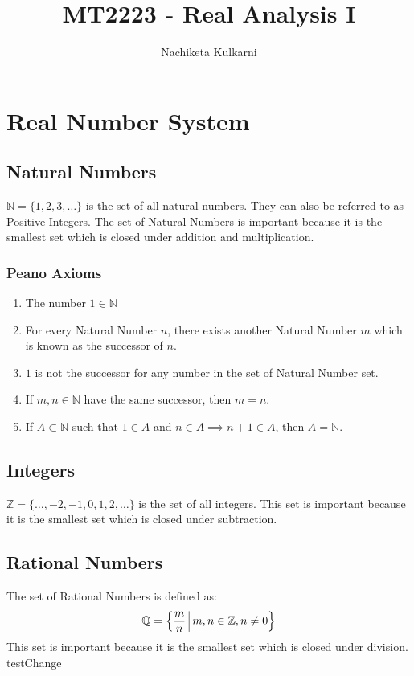 \documentclass[12pt, oneside]{book}
\date{}
\title{MT2223 - Real Analysis I}
\author{Nachiketa Kulkarni}
\theoremstyle{definition}
\begin{document}
\maketitle
\tableofcontents

\mainmatter
\chapter{Real Number System}
\section{Natural Numbers}
\( \mathbb{N} = \{ 1,2,3,\dots \} \) is the set of all natural numbers.
They can also be referred to as Positive Integers.
The set of Natural Numbers is important because it is the smallest set which is closed under addition and multiplication.

\subsection{Peano Axioms}
\begin{enumerate}
	\item The number \(1 \in \mathbb{N}\)
	\item For every Natural Number \(n\), there exists another Natural Number \(m\) which is known as the successor of \(n\).
	\item \(1\) is not the successor for any number in the set of Natural Number set.
	\item If \(m,n \in \mathbb{N}\) have the same successor, then \(m=n\).
	\item If \(A \subset \mathbb{N}\) such that \(1 \in A\) and \(n \in A \implies n+1 \in A\), then \(A = \mathbb{N}\).
\end{enumerate}

\section{Integers}
\( \mathbb{Z} = \{ \dots, -2, -1, 0, 1, 2, \dots \} \) is the set of all integers.
This set is important because it is the smallest set which is closed under subtraction.

\section{Rational Numbers}
The set of Rational Numbers is defined as:
\[ \mathbb{Q} = \left\{ \frac{m}{n} \; \vline \; m,n \in \mathbb{Z}, n \neq 0 \right\} \]
This set is important because it is the smallest set which is closed under division.
testChange
\end{document}

